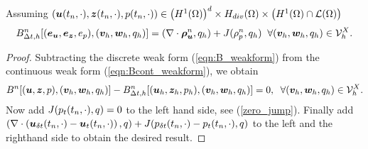 \begin{lemma}
\label{garlerkinorthog}
Assuming  $(\boldsymbol{u}(t_{n}, \cdot),\boldsymbol{z}(t_{n},\cdot),p(t_{n},\cdot)) \in \left(H^{1}(\Omega) \right)^{d} \times H_{div}(\Omega)  \times \left( H^{1}(\Omega)\cap \mathcal{L}(\Omega) \right)$
\begin{equation*}
B_{\Delta t,h}^{n}[(\boldsymbol{e}_{\boldsymbol{u}},\boldsymbol{e}_{\boldsymbol{z}},{e}_{{p}}),(\boldsymbol{v}_{h},\boldsymbol{w}_{h},{q}_{h})] = (\nabla \cdot \boldsymbol{\rho}_{\boldsymbol{u}}^{n},{q}_{h} )+  J({\rho}_{p}^{n},{q}_{h}) \;\; \forall (\boldsymbol{v}_{h},\boldsymbol{w}_{h},{q}_{h}) \in \mathcal{V}^{X}_{h}.
\end{equation*}
\end{lemma}
\begin{proof}
Subtracting the discrete weak form (\ref{eqn:B_weakform}) from the continuous weak form (\ref{eqn:Bcont_weakform}), we obtain
\begin{equation*}
 B^{n}[(\boldsymbol{u},\boldsymbol{z},p),(\boldsymbol{v}_{h},\boldsymbol{w}_{h},{q}_{h})]-B_{\Delta t,h}^{n}[(\boldsymbol{u}_{h},\boldsymbol{z}_{h},p_h),(\boldsymbol{v}_{h},\boldsymbol{w}_{h},{q}_{h})]=0, \;\;  \forall (\boldsymbol{v}_{h},\boldsymbol{w}_{h},{q}_{h}) \in \mathcal{V}^{X}_{h}.
\end{equation*}
Now add $J({{p}_{t}}(t_{n},\cdot),{q})=0$ to the left hand side, see  (\ref{zero_jump}). Finally add $ (\nabla \cdot \left ( {\boldsymbol{u}_{\delta t}}(t_{n},\cdot) -{\boldsymbol{u}_{t}}(t_{n},\cdot)  \right),{q}) + J( {{p}_{\delta t}}(t_{n}, \cdot) -{{p}_{t}}(t_{n},\cdot),{q}  )$ to the left and the righthand side to obtain the desired result.
\end{proof}


